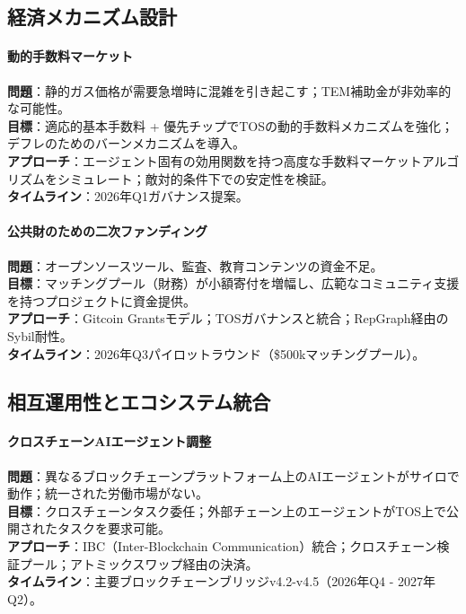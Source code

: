 \documentclass[11pt]{article}
\begin{document}
\subsection{経済メカニズム設計}

\paragraph{動的手数料マーケット}
\textbf{問題}：静的ガス価格が需要急増時に混雑を引き起こす；TEM補助金が非効率的な可能性。\\
\textbf{目標}：適応的基本手数料 + 優先チップでTOSの動的手数料メカニズムを強化；デフレのためのバーンメカニズムを導入。\\
\textbf{アプローチ}：エージェント固有の効用関数を持つ高度な手数料マーケットアルゴリズムをシミュレート；敵対的条件下での安定性を検証。\\
\textbf{タイムライン}：2026年Q1ガバナンス提案。

\paragraph{公共財のための二次ファンディング}
\textbf{問題}：オープンソースツール、監査、教育コンテンツの資金不足。\\
\textbf{目標}：マッチングプール（財務）が小額寄付を増幅し、広範なコミュニティ支援を持つプロジェクトに資金提供。\\
\textbf{アプローチ}：Gitcoin Grantsモデル；TOSガバナンスと統合；RepGraph経由のSybil耐性。\\
\textbf{タイムライン}：2026年Q3パイロットラウンド（\$500kマッチングプール）。

\subsection{相互運用性とエコシステム統合}

\paragraph{クロスチェーンAIエージェント調整}
\textbf{問題}：異なるブロックチェーンプラットフォーム上のAIエージェントがサイロで動作；統一された労働市場がない。\\
\textbf{目標}：クロスチェーンタスク委任；外部チェーン上のエージェントがTOS上で公開されたタスクを要求可能。\\
\textbf{アプローチ}：IBC（Inter-Blockchain Communication）統合；クロスチェーン検証プール；アトミックスワップ経由の決済。\\
\textbf{タイムライン}：主要ブロックチェーンブリッジv4.2-v4.5（2026年Q4 - 2027年Q2）。
\end{document}
